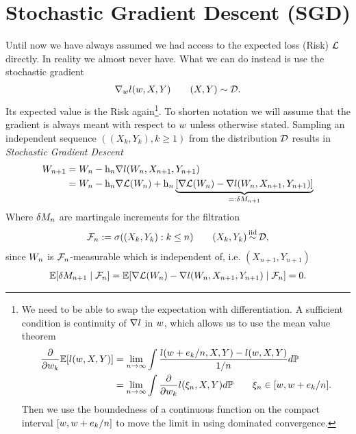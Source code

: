 
\chapter{Stochastic Gradient Descent (SGD)}\label{chap: sgd}

Until now we have always assumed we had access to the expected loss (Risk)
\(\mathcal{L}\) directly. In reality we almost never have. What we can do instead is
use the stochastic gradient
%
\begin{align*}
	\nabla_wl (w, X,Y) \qquad (X,Y)\sim\mathcal{D}.
\end{align*}
%
Its expected value is the Risk again\footnote{
	We need to be able to swap the expectation with differentiation. A sufficient 
	condition is continuity of \(\nabla l\) in \(w\), which allows us
	to use the mean value theorem
	\begin{align*}
		\frac{\partial}{\partial w_k}\mathbb{E}[l(w, X,Y)]
		&= \lim_{n\to\infty}
		\int\frac{l(w+e_k/n, X,Y)-l(w,X,Y)}{1/n}d\mathbb{P}
		\\
		&=\lim_{n\to\infty} \int\frac{\partial}{\partial w_k}l(\xi_n, X,Y)d\mathbb{P}
		\qquad \xi_n \in [w, w + e_k/n].
	\end{align*}
	Then we use the boundedness of a continuous function on the compact interval
	\([w, w + e_k/n]\) to move the limit in using
	dominated convergence.
}. To shorten notation we will assume that the gradient is always meant
with respect to \(w\) unless otherwise stated.
Sampling an independent sequence \(((X_k,Y_k), k\ge 1)\) from the 
distribution \(\mathcal{D}\) results in \emph{Stochastic Gradient Descent}
%
\begin{align*}
	W_{n+1}
	&= W_n - \text{h}_n\nabla l(W_n, X_{n+1},Y_{n+1})\\
	&= W_n - \text{h}_n\nabla\mathcal{L}(W_n)
	+ \text{h}_n\underbrace{
		[\nabla\mathcal{L}(W_n) - \nabla l(W_n, X_{n+1}, Y_{n+1})]
	}_{=:\delta M_{n+1}}
\end{align*}
Where \(\delta M_n\) are martingale increments for the filtration
\begin{align*}
	\filtration_n :=\sigma((X_k, Y_k): k\le n )
	\qquad (X_k,Y_k)\stackrel{\text{iid}}{\sim}\dist,
\end{align*}
since \(W_n\) is \(\mathcal{F}_n\)-measurable which is independent of, i.e.
\((X_{n+1},Y_{n+1})\)
\begin{align}\label{eq: conditional independence of martingale increments}
	\mathbb{E}[\delta M_{n+1}\mid \mathcal{F}_n]
	= \mathbb{E}[\nabla\mathcal{L}(W_n) - \nabla l(W_n, X_{n+1}, Y_{n+1})\mid \mathcal{F}_n]
	= 0.
\end{align}
%
